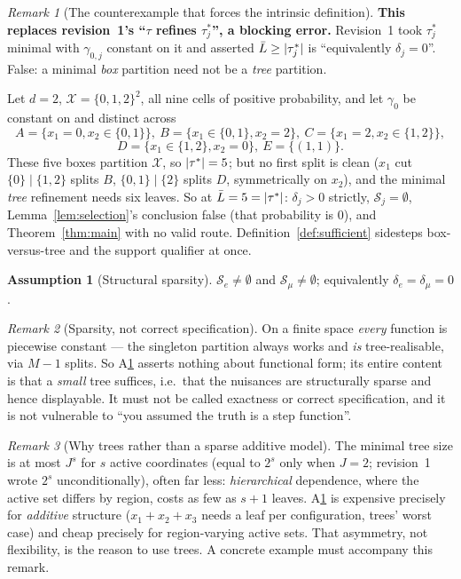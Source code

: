 \documentclass[11pt]{article}
\theoremstyle{plain}
\theoremstyle{definition}
\newtheorem{assumption}{Assumption}
\theoremstyle{remark}
\newtheorem{remark}{Remark}
\newcommand{\cX}{\mathcal{X}}
\newcommand{\cS}{\mathcal{S}}
\DeclarePairedDelimiter{\card}{\lvert}{\rvert}
\begin{document}
\begin{remark}[The counterexample that forces the intrinsic definition]
\label{rem:pinwheel}
\textbf{This replaces revision~1's ``$\tau$ refines $\tau^*_j$'', a blocking
error.} Revision~1 took $\tau^*_j$ minimal with $\gamma_{0,j}$ constant on it and
asserted $\bar L\ge\card{\tau^*_j}$ is ``equivalently $\delta_j=0$''. False: a
minimal \emph{box} partition need not be a \emph{tree} partition.

Let $d=2$, $\cX=\{0,1,2\}^2$, all nine cells of positive probability, and let
$\gamma_0$ be constant on and distinct across
\[
 A=\{x_1{=}0,x_2\in\{0,1\}\},\ B=\{x_1\in\{0,1\},x_2{=}2\},\
 C=\{x_1{=}2,x_2\in\{1,2\}\},
\]
\[
 D=\{x_1\in\{1,2\},x_2{=}0\},\ E=\{(1,1)\}.
\]
These five boxes partition $\cX$, so $\card{\tau^*}=5$; but no first split is
clean ($x_1$ cut $\{0\}\mid\{1,2\}$ splits $B$, $\{0,1\}\mid\{2\}$ splits $D$,
symmetrically on $x_2$), and the minimal \emph{tree} refinement needs six leaves.
So at $\bar L=5=\card{\tau^*}$: $\delta_j>0$ strictly, $\cS_j=\emptyset$,
Lemma~\ref{lem:selection}'s conclusion false (that probability is $0$), and
Theorem~\ref{thm:main} with no valid route. Definition~\ref{def:sufficient}
sidesteps box-versus-tree and the support qualifier at once.
\end{remark}

\begin{assumption}[Structural sparsity]\label{ass:sparsity}
$\cS_e\ne\emptyset$ and $\cS_\mu\ne\emptyset$; equivalently
$\delta_e=\delta_\mu=0$.
\end{assumption}

\begin{remark}[Sparsity, not correct specification]\label{rem:not-exact}
On a finite space \emph{every} function is piecewise constant --- the singleton
partition always works and \emph{is} tree-realisable, via $M-1$ splits. So
A\ref{ass:sparsity} asserts nothing about functional form; its entire content is
that a \emph{small} tree suffices, i.e.\ that the nuisances are structurally
sparse and hence displayable. It must not be called exactness or correct
specification, and it is not vulnerable to ``you assumed the truth is a step
function''.
\end{remark}

\begin{remark}[Why trees rather than a sparse additive model]\label{rem:additive}
The minimal tree size is at most $J^s$ for $s$ active coordinates (equal to $2^s$
only when $J=2$; revision~1 wrote $2^s$ unconditionally), often far less:
\emph{hierarchical} dependence, where the active set differs by region, costs as
few as $s+1$ leaves. A\ref{ass:sparsity} is expensive precisely for
\emph{additive} structure ($x_1+x_2+x_3$ needs a leaf per configuration, trees'
worst case) and cheap precisely for region-varying active sets. That asymmetry,
not flexibility, is the reason to use trees. A concrete example must accompany
this remark.
\end{remark}
\end{document}
